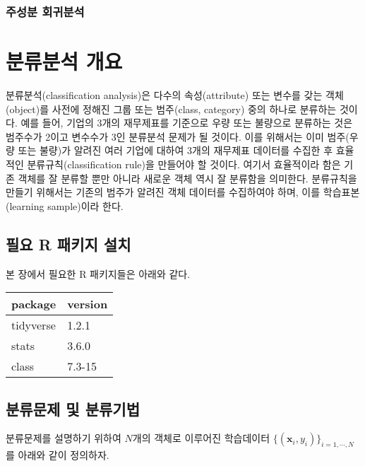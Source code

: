 \documentclass[]{book}
\begin{document}
\hypertarget{pca-regression}{%
\subsection{주성분 회귀분석}\label{pca-regression}}

\hypertarget{classification-analysis}{%
\chapter{분류분석 개요}\label{classification-analysis}}

분류분석(classification analysis)은 다수의 속성(attribute) 또는 변수를 갖는 객체(object)를 사전에 정해진 그룹 또는 범주(class, category) 중의 하나로 분류하는 것이다. 예를 들어, 기업의 3개의 재무제표를 기준으로 우량 또는 불량으로 분류하는 것은 범주수가 2이고 변수수가 3인 분류분석 문제가 될 것이다. 이를 위해서는 이미 범주(우량 또는 불량)가 알려진 여러 기업에 대하여 3개의 재무제표 데이터를 수집한 후 효율적인 분류규칙(classification rule)을 만들어야 할 것이다. 여기서 효율적이라 함은 기존 객체를 잘 분류할 뿐만 아니라 새로운 객체 역시 잘 분류함을 의미한다. 분류규칙을 만들기 위해서는 기존의 범주가 알려진 객체 데이터를 수집하여야 하며, 이를 학습표본(learning sample)이라 한다.

\hypertarget{classification-packages-install}{%
\section{필요 R 패키지 설치}\label{classification-packages-install}}

본 장에서 필요한 R 패키지들은 아래와 같다.

\begin{tabular}{l|l}
\hline
package & version\\
\hline
tidyverse & 1.2.1\\
\hline
stats & 3.6.0\\
\hline
class & 7.3-15\\
\hline
\end{tabular}

\hypertarget{classification-problem-methods}{%
\section{분류문제 및 분류기법}\label{classification-problem-methods}}

분류문제를 설명하기 위하여 \(N\)개의 객체로 이루어진 학습데이터 \(\{(\mathbf{x}_i, y_i)\}_{i = 1, \cdots, N}\)를 아래와 같이 정의하자.
\end{document}
